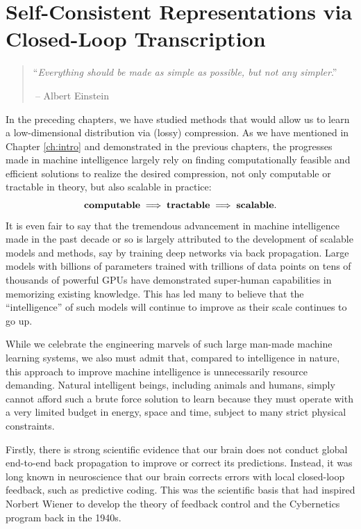 \documentclass[../../book-main.tex]{subfiles}
\begin{document}
\chapter{Self-Consistent Representations via Closed-Loop Transcription}
\label{ch:self-consistent}\label{ch:closed-loop}

\begin{quote}
\hfill  ``{\em Everything should be made as simple as possible, but not any simpler}.''

$~$\hfill -- Albert Einstein
\end{quote}
\vspace{5mm}

In the preceding chapters, we have studied methods that would allow us to learn a low-dimensional distribution via (lossy) compression. As we have mentioned in Chapter \ref{ch:intro} and demonstrated in the previous chapters, the progresses made in machine intelligence largely rely on finding computationally feasible and efficient solutions to realize the desired compression, not only computable or tractable in theory, but also scalable in practice:
\begin{equation}
\mbox{\textbf{computable}} \;
   \Longrightarrow \; \mbox{\textbf{tractable}} \; \Longrightarrow \; 
   \mbox{\textbf{scalable}}.
\end{equation}
It is even fair to say that the tremendous advancement in machine intelligence made in the past decade or so is largely attributed to the development of scalable models and methods, say by training deep networks via back propagation. Large models with billions of parameters trained with trillions of data points on tens of thousands of powerful GPUs have demonstrated super-human  capabilities in memorizing existing knowledge. This has led many to believe that the ``intelligence'' of such models will continue to improve as their scale continues to go up. 

While we celebrate the engineering marvels of such large man-made machine learning  systems, we also must admit that, compared to intelligence in nature, this approach to improve machine intelligence is  unnecessarily resource demanding.  Natural intelligent beings, including animals and humans, simply cannot afford such a brute force solution to learn because they must operate with a very limited budget in energy, space and time, subject to many strict physical constraints. 

Firstly, there is strong scientific evidence that our brain does not conduct global end-to-end back propagation to improve or correct its predictions. Instead, it was long known in neuroscience that our brain corrects errors with local closed-loop feedback, such as predictive coding. This was the scientific basis that had inspired Norbert Wiener to develop the theory of feedback control and the Cybernetics program back in the 1940s. 
\end{document}
